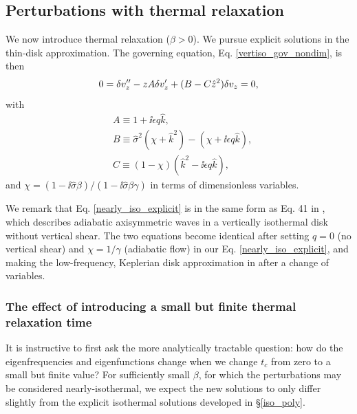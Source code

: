 \subsection{Perturbations with thermal relaxation}\label{analytic_relax}
We now introduce thermal relaxation ($\beta>0$). We pursue explicit
solutions in the thin-disk approximation. The governing equation,
Eq. \ref{vertiso_gov_nondim}, is then 
\begin{align}
  0 = \delta v_z^{\prime\prime} - z A\delta v_z^\prime +
  (B - C\hat{z}^2)\delta v_z = 0,\label{nearly_iso_explicit}
\end{align}
with
\begin{align}
  &A \equiv 1 + \ii \epsilon q \hat{k},\\
  &B \equiv \hat{\sigma}^2\left(\chi + \hat{k}^2\right) -
  \left(\chi + \ii \epsilon q \hat{k}\right),\\
  &C \equiv \left(1-\chi\right)\left(\hat{k}^2 - \ii
    \epsilon q\hat{k}\right), 
\end{align}
and $\chi =
\left(1-\ii\hat{\sigma}\beta\right)/\left(1-\ii\hat{\sigma}\beta\gamma\right)
$ in terms of dimensionless variables. 

We remark that Eq. \ref{nearly_iso_explicit} is in the same
form as Eq. 41 in \cite{lubow93}, which describes adiabatic axisymmetric waves in
a vertically isothermal disk without vertical shear. The two equations
become identical after  setting $q=0$ (no vertical shear) and
$\chi=1/\gamma$ (adiabatic flow) in our Eq. \ref{nearly_iso_explicit},
and making the low-frequency, Keplerian disk approximation in
\citeauthor{lubow93} after a change of variables.    

\subsubsection{The effect of introducing a small but finite
  thermal relaxation time}\label{relax_pert}
It is instructive to first ask  the more analytically tractable
question: how 
do the eigenfrequencies and eigenfunctions change when we change
$t_c$ from zero to a small but finite value? For sufficiently small
$\beta$, for which the perturbations may be considered 
nearly-isothermal, we expect the new solutions to only differ slightly
from the explicit isothermal solutions developed in \S\ref{iso_poly}. 


